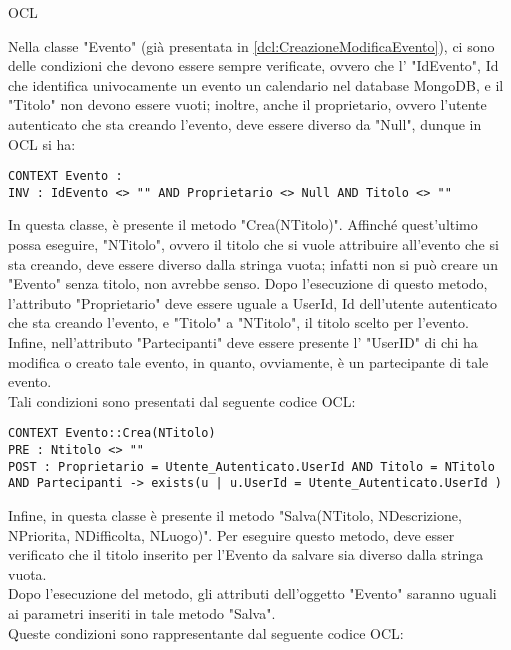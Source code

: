 \begin{listaPersonale}{OCL}
    \begin{center}
        
    \end{center}
    Nella classe "Evento" (già presentata in \ref{dcl:CreazioneModificaEvento}), ci sono delle condizioni che devono essere sempre verificate, ovvero che l' "IdEvento", Id che identifica univocamente un evento un calendario nel database MongoDB, e il "Titolo" non devono essere vuoti; inoltre, anche il proprietario, ovvero l'utente autenticato che sta creando l'evento, deve essere diverso da "Null", dunque in OCL si ha:
    \begin{lstlisting}
CONTEXT Evento :
INV : IdEvento <> "" AND Proprietario <> Null AND Titolo <> ""
    \end{lstlisting}
    In questa classe, è presente il metodo "Crea(NTitolo)". Affinché quest'ultimo possa eseguire, "NTitolo", ovvero il titolo che si vuole attribuire all'evento che si sta creando, deve essere diverso dalla stringa vuota; infatti non si può creare un "Evento" senza titolo, non avrebbe senso. Dopo l'esecuzione di questo metodo, l'attributo "Proprietario" deve essere uguale a UserId, Id dell'utente autenticato che sta creando l'evento, e "Titolo" a "NTitolo", il titolo scelto per l'evento. Infine, nell'attributo "Partecipanti" deve essere presente l' "UserID" di chi ha modifica o creato tale evento, in quanto, ovviamente, è un partecipante di tale evento. \\
    Tali condizioni sono presentati dal seguente codice OCL:
    \begin{lstlisting}
CONTEXT Evento::Crea(NTitolo)
PRE : Ntitolo <> ""
POST : Proprietario = Utente_Autenticato.UserId AND Titolo = NTitolo AND Partecipanti -> exists(u | u.UserId = Utente_Autenticato.UserId )
    \end{lstlisting}
    Infine, in questa classe è presente il metodo "Salva(NTitolo, NDescrizione, NPriorita, NDifficolta, NLuogo)". Per eseguire questo metodo, deve esser verificato che il titolo inserito per l'Evento da salvare sia diverso dalla stringa vuota. \\
    Dopo l'esecuzione del metodo, gli attributi dell'oggetto "Evento" saranno uguali ai parametri inseriti in tale metodo "Salva". \\
    Queste condizioni sono rappresentante dal seguente codice OCL:


\end{listaPersonale}
